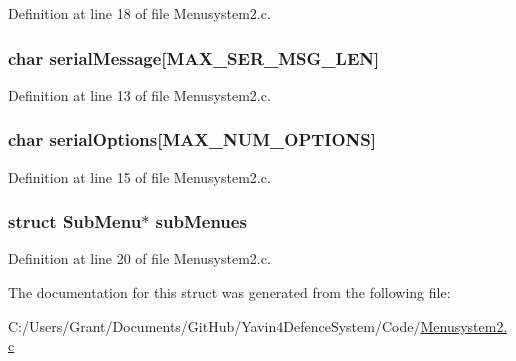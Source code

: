 Definition at line 18 of file Menusystem2.\+c.

\hypertarget{struct_sub_menu_a24706f7b55951b0e21967a256e107936}{
\subsubsection[{serial\+Message}]{\setlength{\rightskip}{0pt plus 5cm}char serial\+Message\mbox{[}{\bf M\+A\+X\+\_\+\+S\+E\+R\+\_\+\+M\+S\+G\+\_\+\+L\+E\+N}\mbox{]}}}\label{struct_sub_menu_a24706f7b55951b0e21967a256e107936}


Definition at line 13 of file Menusystem2.\+c.

\hypertarget{struct_sub_menu_adcfcbb5b5340baf34c70fb8f4cc66f72}{
\subsubsection[{serial\+Options}]{\setlength{\rightskip}{0pt plus 5cm}char serial\+Options\mbox{[}{\bf M\+A\+X\+\_\+\+N\+U\+M\+\_\+\+O\+P\+T\+I\+O\+N\+S}\mbox{]}}}\label{struct_sub_menu_adcfcbb5b5340baf34c70fb8f4cc66f72}


Definition at line 15 of file Menusystem2.\+c.

\hypertarget{struct_sub_menu_a915aa121e09e4c3f914dc59727f390e3}{
\subsubsection[{sub\+Menues}]{\setlength{\rightskip}{0pt plus 5cm}struct {\bf Sub\+Menu}$\ast$ sub\+Menues}}\label{struct_sub_menu_a915aa121e09e4c3f914dc59727f390e3}


Definition at line 20 of file Menusystem2.\+c.



The documentation for this struct was generated from the following file\+:\begin{DoxyCompactItemize}
\item 
C\+:/\+Users/\+Grant/\+Documents/\+Git\+Hub/\+Yavin4\+Defence\+System/\+Code/\hyperlink{_menusystem2_8c}{Menusystem2.\+c}\end{DoxyCompactItemize}
